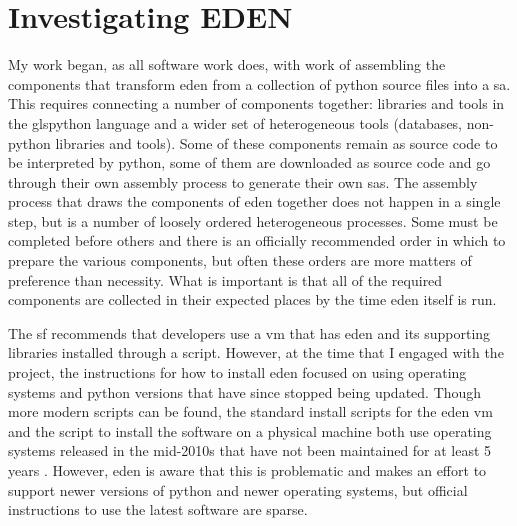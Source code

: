\documentclass[a4paper,man,natbib,floatsintext]{apa6}
\begin{document}
  \section*{Investigating EDEN}
   My work began, as all software work does, with work of assembling the components that transform \acrshort{eden} from a collection of \gls{python} source files into a \gls{sa}. This requires connecting a number of components together: libraries and tools in the gls{python} language and a wider set of heterogeneous tools (databases, non-\gls{python} libraries and tools). Some of these components remain as source code to be interpreted by \gls{python}, some of them are downloaded as source code and go through their own assembly process to generate their own \glspl{sa}. The assembly process that draws the components of \acrshort{eden} together does not happen in a single step, but is a number of loosely ordered heterogeneous processes. Some must be completed before others and there is an officially recommended order in which to prepare the various components, but often these orders are more matters of preference than necessity. What is important is that all of the required components are collected in their expected places by the time \acrshort{eden} itself is run. 

   The \gls{sf} recommends that developers use a \gls{vm} that has \acrshort{eden} and its supporting libraries installed through a script. However, at the time that I engaged with the project, the instructions for how to install \acrshort{eden} focused on using operating systems and \gls{python} versions that have since stopped being updated. Though more modern scripts can be found, the standard install scripts for the \acrshort{eden} \gls{vm} and the script to install the software on a physical machine both use operating systems released in the mid-2010s that have not been maintained for at least 5 years \citep{Canonical2020-ru}. However, \acrshort{eden} is aware that this is problematic and makes an effort to support newer versions of \gls{python} and newer operating systems, but official instructions to use the latest software are sparse.
\end{document}
